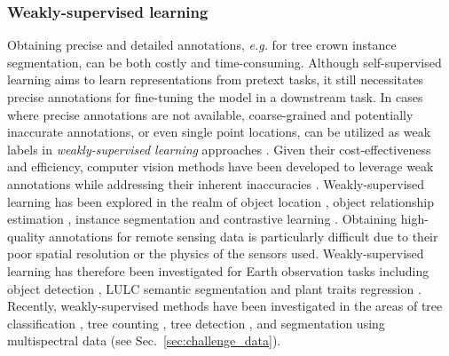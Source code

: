\documentclass{CUP-JNL-DTM}%
\theoremstyle{definition}
\numberwithin{equation}{section}
\begin{document}
\subsubsection{Weakly-supervised learning}
\label{sec:ml_weakly}
Obtaining precise and detailed annotations, \textit{e.g.} for tree crown instance segmentation, can be both costly and time-consuming. 
Although self-supervised learning aims to learn representations from pretext tasks, it still necessitates precise annotations for fine-tuning the model in a downstream task. 
In cases where precise annotations are not available, coarse-grained and potentially inaccurate annotations, or even single point locations, can be utilized as weak labels in \emph{weakly-supervised learning} approaches \cite{zhou_brief_2018}.
%
Given their cost-effectiveness and efficiency, computer vision methods have been developed to leverage weak annotations while addressing their inherent inaccuracies \cite{zhou_brief_2018}.
%
Weakly-supervised learning has been explored in the realm of object location \cite{oquab_is_2015}, object relationship estimation \cite{peyre_weakly-supervised_2017}, instance segmentation \cite{ahn_weakly_2019} and contrastive learning \cite{zheng_weakly_2021}.
%
Obtaining high-quality annotations for remote sensing data is particularly difficult due to their poor spatial resolution or the physics of the sensors used. Weakly-supervised learning has therefore been investigated for Earth observation tasks 
including object detection \cite{dingwen_zhang_weakly_2015, han_object_2015, yao_automatic_2021}, LULC semantic segmentation \cite{wang_weakly_2020, yao_semantic_2016} and plant traits regression \cite{cherif_spectra_2023, schiller_deep_2021}.
%
Recently, weakly-supervised methods have been investigated in the areas of tree classification \cite{illarionova_tree_2021}, tree counting \cite{amirkolaee_treeformer_2023}, tree detection \cite{aygunes_weakly_2021}, and segmentation \cite{gazzea_tree_2022} using multispectral data (see Sec.~\ref{sec:challenge_data}).
\end{document}
